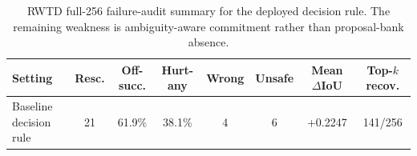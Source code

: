 \begin{table}[t]
\centering
\small
\begin{tabularx}{\textwidth}{@{}Xccccccc@{}}
\toprule
Setting & Resc. & Off-succ. & Hurt-any & Wrong & Unsafe & Mean $\Delta$IoU & Top-$k$ recov. \\
\midrule
Baseline decision rule & 21 & 61.9\% & 38.1\% & 4 & 6 & +0.2247 & 141/256 \\
\bottomrule
\end{tabularx}
\caption{RWTD full-256 failure-audit summary for the deployed decision rule. The remaining weakness is ambiguity-aware commitment rather than proposal-bank absence.}
\label{tab:rwtd_audit}
\end{table}
